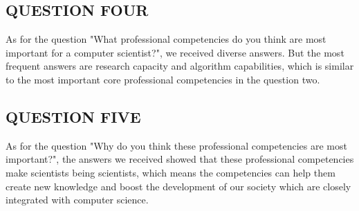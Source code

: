 \documentclass[conference]{IEEEtran}
\begin{document}
\subsection{QUESTION FOUR}
\par As for the question "What professional competencies do you think are most important for a computer scientist?", we received diverse answers. But the most frequent answers are research capacity and algorithm capabilities, which is similar to the most important core professional competencies in the question two.

\subsection{QUESTION FIVE}
\par As for the question "Why do you think these professional competencies are most important?", the answers we received showed that these professional competencies make scientists being scientists, which means the competencies can help them create new knowledge and boost the development of our society which are closely integrated with computer science.
\end{document}

